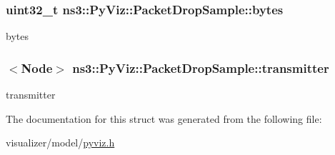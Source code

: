\subsubsection[{\texorpdfstring{bytes}{bytes}}]{\setlength{\rightskip}{0pt plus 5cm}uint32\+\_\+t ns3\+::\+Py\+Viz\+::\+Packet\+Drop\+Sample\+::bytes}\hypertarget{structns3_1_1PyViz_1_1PacketDropSample_aef17684b0f3f9e58f7b1f45f49b7e4da}{}\label{structns3_1_1PyViz_1_1PacketDropSample_aef17684b0f3f9e58f7b1f45f49b7e4da}


bytes 

\subsubsection[{\texorpdfstring{transmitter}{transmitter}}]{$<${\bf Node}$>$ ns3\+::\+Py\+Viz\+::\+Packet\+Drop\+Sample\+::transmitter}\hypertarget{structns3_1_1PyViz_1_1PacketDropSample_a48da4df9e1f62cf7dc692ce1cbab9f63}{}\label{structns3_1_1PyViz_1_1PacketDropSample_a48da4df9e1f62cf7dc692ce1cbab9f63}


transmitter 



The documentation for this struct was generated from the following file\+:\begin{DoxyCompactItemize}
\item 
visualizer/model/\hyperlink{pyviz_8h}{pyviz.\+h}\end{DoxyCompactItemize}
